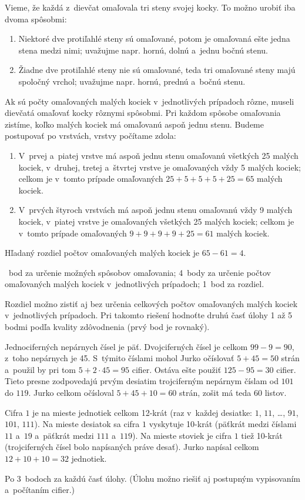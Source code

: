 {%
Vieme, že každá z~dievčat omaľovala tri steny svojej kocky.
To možno urobiť iba dvoma spôsobmi:
\begin{enumerate}
  \item Niektoré dve protiľahlé steny sú omaľované, potom je omaľovaná ešte
    jedna stena medzi nimi; uvažujme napr. hornú, dolnú a~jednu bočnú stenu.
  \item Žiadne dve protiľahlé steny nie sú omaľované, teda tri omaľované steny
    majú spoločný vrchol; uvažujme napr. hornú, prednú a~bočnú stenu.
\end{enumerate}

Ak sú počty omaľovaných malých kociek v~jednotlivých prípadoch rôzne, museli
dievčatá omaľovať kocky rôznymi spôsobmi. Pri každom spôsobe omaľovania zistíme,
koľko malých kociek má omaľovanú aspoň jednu stenu.
Budeme postupovať po vrstvách, vrstvy počítame zdola:
\begin{enumerate}
  \item V~prvej a~piatej vrstve má aspoň jednu stenu omaľovanú všetkých 25 malých kociek,
    v~druhej, tretej a~štvrtej vrstve je omaľovaných vždy 5 malých kociek;
    celkom je v~tomto prípade omaľovaných $25+5+5+5+25=65$ malých kociek.
  \item V~prvých štyroch vrstvách má aspoň jednu stenu omaľovanú vždy 9
    malých kociek, v~piatej vrstve je omaľovaných všetkých 25 malých kociek;
    celkom je v~tomto prípade omaľovaných $9+9+9+9+25=61$ malých kociek.
\end{enumerate}
Hľadaný rozdiel počtov omaľovaných malých kociek je $65-61=4$.

~bod za určenie možných spôsobov omaľovania;
4~body za určenie počtov omaľovaných malých kociek v~jednotlivých prípadoch;
1~bod za rozdiel.

\poznamka
Rozdiel možno zistiť aj bez určenia celkových počtov omaľovaných malých kociek v~jednotlivých
prípadoch. Pri takomto riešení hodnoťte druhú časť úlohy 1 až 5 bodmi podľa kvality
zdôvodnenia (prvý bod je rovnaký).
\endhodnotenie
}

{%
Jednociferných nepárnych čísel je päť.
Dvojciferných čísel je celkom ${99-9}=90$, z~toho nepárnych je 45.
S~týmito číslami mohol Jurko očíslovať $5+45=50$ strán a~použil by pri tom $5+2\cdot45=95$ cifier.
Ostáva ešte použiť $125-95=30$ cifier.
Tieto presne zodpovedajú prvým desiatim trojciferným nepárnym číslam od $101$ do $119$.
Jurko celkom očísloval $5+45+10=60$ strán, zošit má teda 60 listov.

\smallskip
Cifra $1$ je na mieste jednotiek celkom 12-krát (raz v~každej
desiatke: $1$, $11$, \dots, $91$, $101$, $111$).
Na mieste desiatok sa cifra $1$ vyskytuje 10-krát (päťkrát medzi číslami $11$ a~$19$ a~päťkrát medzi $111$ a~$119$).
Na mieste stoviek je cifra $1$ tiež 10-krát (trojciferných čísel bolo napísaných práve desať).
Jurko napísal celkom $12+10+10=32$ jednotiek.

\hodnotenie
Po 3~bodoch za každú časť úlohy.
(Úlohu možno riešiť aj postupným vypisovaním a~počítaním cifier.)
\endhodnotenie
 }

